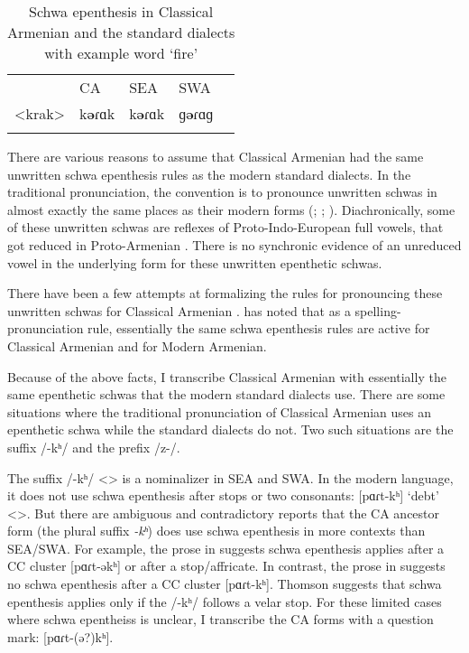 \documentclass[output=paper]{langscibook}
\begin{document}
\begin{table}
	\caption{Schwa epenthesis in Classical Armenian and the standard dialects with example word `fire'} \label{tab:HossepIntro:schwaEpen}
	\begin{tabular}{ l  lll  l }
		\lsptoprule  	& CA & SEA & SWA & \\ \cmidrule(lr){2-4}	
		<krak> & k\textbf{ə}ɾɑk &k\textbf{ə}ɾɑk &ɡ\textbf{ə}ɾɑɡ & \armenian{կրակ}
		\\\lspbottomrule 
	\end{tabular}
\end{table}

There are various reasons to assume that Classical Armenian had the same unwritten schwa epenthesis rules as the modern standard dialects. In the traditional pronunciation, the convention is to pronounce unwritten schwas in almost exactly the same places as their modern forms (\citealt[16]{Godel-1975-IntroClassicalArmenian}; \citealt[116]{Thomson-1989-IntroClassicalArmenian}; \citealt[1043]{Macak-2017-PhonoClassicalArmenian}). Diachronically, some of these unwritten schwas are reflexes of Proto-Indo-European full vowels, that got reduced in Proto-Armenian \citep[26]{Vaux-1998-ArmenianPhono}. There is no synchronic evidence of an unreduced vowel in the underlying form for these unwritten epenthetic schwas.

There have been a few attempts at formalizing the rules for pronouncing these unwritten schwas for Classical Armenian \citep{Hammalian-1984-PhonoOldArmenian,Schwink-1994-ArmenianSchwaLexicalized,Pierce-2007-SchwaClassicalArmenian}. \citet{Pierce-2007-SchwaClassicalArmenian} has noted that as a spelling-pronunciation rule, essentially the same schwa epenthesis rules are active for Classical Armenian and for Modern Armenian.
 
Because of the above facts, I transcribe Classical Armenian with essentially the same epenthetic schwas that the modern standard dialects use. There are some situations where the traditional pronunciation of Classical Armenian   uses an epenthetic schwa while the standard dialects do not. Two such situations are the suffix /-kʰ/ and the prefix /z-/. 

The suffix /-kʰ/ <> is a nominalizer in SEA and SWA. In the modern language, it does not use schwa epenthesis after stops or two consonants: [pɑɾt-kʰ] `debt' <>. But there are ambiguous and contradictory reports that the CA ancestor form (the plural suffix \textit{-kʰ}) does use schwa epenthesis in more contexts than SEA/SWA. For example, the prose  in \citet[18-19]{Godel-1975-IntroClassicalArmenian} suggests schwa epenthesis applies after a CC cluster [pɑɾt-əkʰ] or after a stop/affricate. In contrast, the prose in \citet[120]{Thomson-1989-IntroClassicalArmenian} suggests no schwa epenthesis after a CC cluster [pɑɾt-kʰ]. Thomson suggests that schwa epenthesis applies only if the /-kʰ/ follows a velar stop. For these limited cases where schwa epentheiss is unclear, I transcribe the CA forms with a question mark: [pɑɾt-(ə?)kʰ]. 
\end{document}
